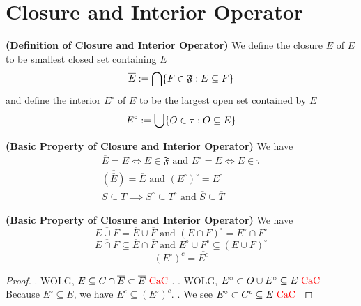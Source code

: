 \documentclass{report}
\begin{document}
\section{Closure and Interior Operator}
\begin{definition}
\label{2.2.1}
\textbf{(Definition of Closure and Interior Operator)} We define the closure $\overline{E}$ of $E$ to be smallest closed set containing $E$
\begin{equation}
  \overline{E}:=\bigcap \{ F\in\mathfrak{F}:E\subseteq F \}
\end{equation}
and define the interior $E^\circ$ of  $E$ to be the largest open set contained by  $E$ 
\begin{equation}
E^\circ :=\bigcup  \{ O\in\tau :O \subseteq E \}
\end{equation}
\end{definition}
\begin{theorem}
\label{2.2.2}
\textbf{(Basic Property of Closure and Interior Operator)} We have
\begin{gather}
  \overline{E}=E\iff E\in\mathfrak{F}\text{ and }E^\circ=E\iff E\in\tau\\
\overline{(\overline{E})}=\overline{E}\text{ and }(E^\circ)^\circ=E^\circ\\
  S\subseteq T \implies S^\circ \subseteq T^\circ\text{ and }\overline{S}\subseteq \overline{T}
\end{gather}
\end{theorem}
\begin{theorem}
\label{2.2.3}
\textbf{(Basic Property of Closure and Interior Operator)} We have 
\begin{equation}
   \overline{E\cup F}=\overline{E}\cup \overline{F}\text{ and }(E\cap F)^\circ=E^\circ \cap F^\circ
\end{equation}
\begin{equation*}
\overline{E\cap F}\subseteq \overline{E}\cap \overline{F}\text{ and }E^\circ \cup F^\circ \subseteq (E\cup F)^\circ 
\end{equation*}
\begin{equation*}
  (E^\circ )^c=\overline{E^c}
\end{equation*}
\end{theorem}
\begin{proof}
. WOLG, $E\subseteq C\cap \overline{E} \subset \overline{E}\text{ \textcolor{red}{CaC} }$. . WOLG, $ E^\circ  \subset O\cup  E^\circ \subseteq E\text{ \textcolor{red}{CaC} }$\\

Because $E^\circ \subseteq E$, we have $E^c \subseteq (E^\circ )^c$. . We see $E^\circ  \subset C^c\subseteq E\text{ \textcolor{red}{CaC} }$
\end{proof}
\end{document}
